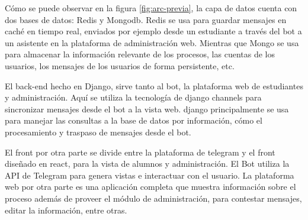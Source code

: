         \par Cómo se puede observar en la figura \ref{fig:arc-previa}, la capa de datos cuenta con dos bases de datos: Redis y Mongodb. Redis se usa para guardar mensajes en caché en tiempo real, enviados por ejemplo desde un estudiante a través del bot a un asistente en la plataforma de administración web. Mientras que Mongo se usa para almacenar la información relevante de los procesos, las cuentas de los usuarios, los mensajes de los usuarios de forma persistente, etc.
        \par El back-end hecho en Django, sirve tanto al bot, la plataforma web de estudiantes y administración. Aquí se utiliza la tecnología de django channels para sincronizar mensajes desde el bot a la vista web. django principalmente se usa para manejar las consultas a la base de datos por información, cómo el procesamiento y traspaso de mensajes desde el bot.
        \par El front por otra parte se divide entre la plataforma de telegram y el front diseñado en react, para la vista de alumnos y administración. El Bot utiliza la API de \gls{Telegram} para genera vistas e interactuar con el usuario. La plataforma web por otra parte es una aplicación completa que muestra información sobre el proceso además de proveer el módulo de administración, para contestar mensajes, editar la información, entre otras.

